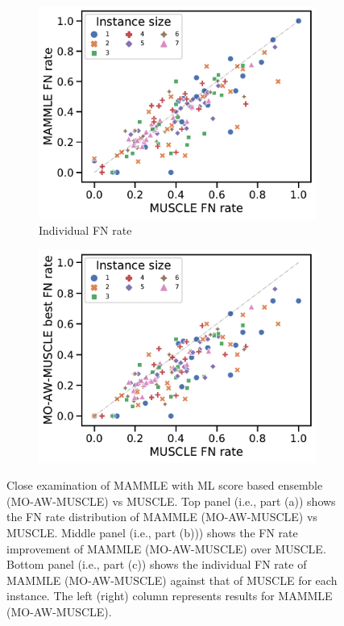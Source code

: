\begin{figure}[!htbp]
\begin{adjustwidth}{-1.2cm}{}
		\begin{subfigure}{0.40\textwidth} \includegraphics[width=\textwidth]{Figure/delta5-ml} \caption{Individual FN rate}\label{fig:scatter-fn-ml}\end{subfigure}
		\begin{subfigure}{0.40\textwidth} \includegraphics[width=\textwidth]{Figure/delta5-momuscle} 
		\end{subfigure}
	\end{adjustwidth}
	\caption[Close examination of MAMMLE with ML score based ensemble (MO-AW-MUSCLE) vs MUSCLE]{Close examination of MAMMLE with ML score based ensemble (MO-AW-MUSCLE) vs MUSCLE. Top panel (i.e., part (a)) shows the FN rate distribution of MAMMLE (MO-AW-MUSCLE) vs MUSCLE. Middle panel (i.e., part (b))) shows the FN rate improvement of MAMMLE (MO-AW-MUSCLE) over MUSCLE. Bottom panel (i.e., part (c)) shows the individual FN rate of MAMMLE (MO-AW-MUSCLE) against that of MUSCLE for each instance. The left (right) column represents results for MAMMLE (MO-AW-MUSCLE).}
	\label{fig:mammle-result-ml}
\end{figure}

